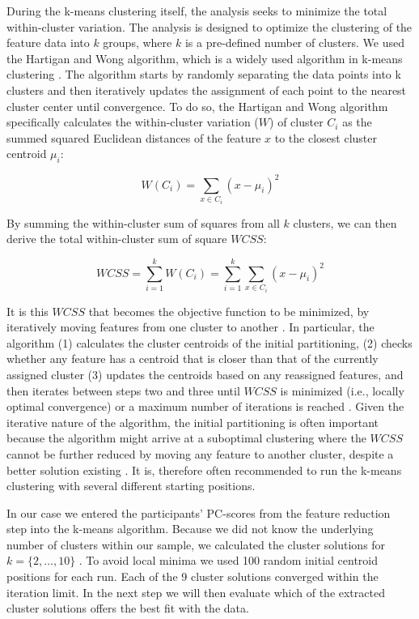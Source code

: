 During the k-means clustering itself, the analysis seeks to minimize the
total within-cluster variation. The analysis is designed to optimize the
clustering of the feature data into \(k\) groups, where \(k\) is a
pre-defined number of clusters. We used the Hartigan and Wong algorithm,
which is a widely used algorithm in k-means clustering
\citep{hartigan1979}. The algorithm starts by randomly separating the
data points into k clusters and then iteratively updates the assignment
of each point to the nearest cluster center until convergence. To do so,
the Hartigan and Wong algorithm specifically calculates the
within-cluster variation (\(W\)) of cluster \(C_i\) as the summed
squared Euclidean distances of the feature \(x\) to the closest cluster
centroid \(\mu_i\):

\begin{equation} \label{eq:kWCi}
  W(C_i) = \sum_{x \in C_i}(x-\mu_i)^2
\end{equation}

By summing the within-cluster sum of squares from all \(k\) clusters, we
can then derive the total within-cluster sum of square \(WCSS\):

\begin{equation} \label{eq:kWCSS}
  WCSS = \sum_{i=1}^k W(C_i) = \sum_{i=1}^k \sum_{x \in C_i} (x - \mu_i)^2
\end{equation}

It is this \(WCSS\) that becomes the objective function to be minimized,
by iteratively moving features from one cluster to another
\citep{hartigan1979}. In particular, the algorithm (1) calculates the
cluster centroids of the initial partitioning, (2) checks whether any
feature has a centroid that is closer than that of the currently
assigned cluster (3) updates the centroids based on any reassigned
features, and then iterates between steps two and three until \(WCSS\)
is minimized (i.e., locally optimal convergence) or a maximum number of
iterations is reached \citep{jain2010}. Given the iterative nature of
the algorithm, the initial partitioning is often important because the
algorithm might arrive at a suboptimal clustering where the \(WCSS\)
cannot be further reduced by moving any feature to another cluster,
despite a better solution existing
\citep[i.e., a local minimum;][]{timmerman2013}. It is, therefore often
recommended to run the k-means clustering with several different
starting positions.

In our case we entered the participants' PC-scores from the feature
reduction step into the k-means algorithm. Because we did not know the
underlying number of clusters within our sample, we calculated the
cluster solutions for \(k=\{2, \dots , 10\}\) . To avoid local minima we
used 100 random initial centroid positions for each run. Each of the 9
cluster solutions converged within the iteration limit. In the next step
we will then evaluate which of the extracted cluster solutions offers
the best fit with the data.
